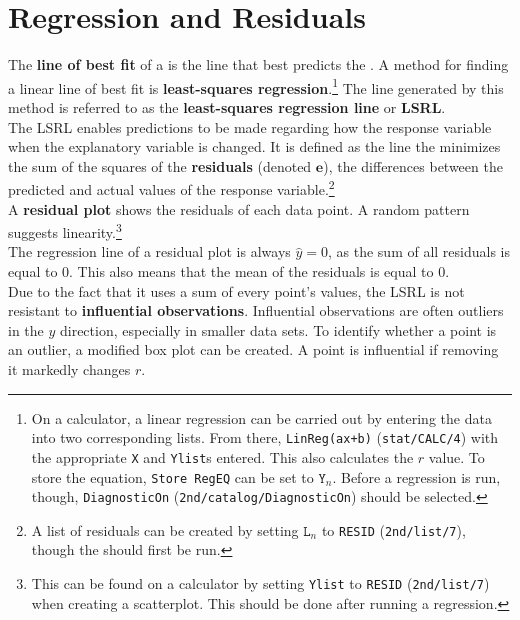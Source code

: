 \documentclass[../AP_Statistics.tex]{subfiles}
\begin{document}
		\section{Regression and Residuals}
			The \textbf{line of best fit} of a  is the line that best predicts the . A method for finding a linear line of best fit is \textbf{least-squares regression}.\footnote{On a calculator, a linear regression can be carried out by entering the data into two corresponding lists. From there, \texttt{LinReg(ax+b)} (\texttt{stat/CALC/4}) with the appropriate \texttt{X} and \texttt{Ylist}s entered. This also calculates the $r$ value. To store the equation, \texttt{Store RegEQ} can be set to $\texttt{Y}_n$. Before a regression is run, though, \texttt{DiagnosticOn} (\texttt{2nd/catalog/DiagnosticOn}) should be selected.} The line generated by this method is referred to as the \textbf{least-squares regression line} or \textbf{LSRL}. \\
			The LSRL enables predictions to be made regarding how the response variable when the explanatory variable is changed. It is defined as the line the minimizes the sum of the squares of the \textbf{residuals} (denoted $\bm{e}$), the differences between the predicted and actual values of the response variable.\footnote{A list of residuals can be created by setting $\texttt{L}_n$ to \texttt{RESID} (\texttt{2nd/list/7}), though the  should first be run.} \\
			A \textbf{residual plot} shows the residuals of each data point. A random pattern suggests linearity.\footnote{This can be found on a calculator by setting \texttt{Ylist} to \texttt{RESID} (\texttt{2nd/list/7}) when creating a scatterplot. This should be done after running a regression.} \\
			The regression line of a residual plot is always $\hat{y} = 0$, as the sum of all residuals is equal to 0. This also means that the mean of the residuals is equal to 0. \\
			Due to the fact that it uses a sum of every point's values, the LSRL is not resistant to \textbf{influential observations}. Influential observations are often outliers in the $y$ direction, especially in smaller data sets. To identify whether a point is an outlier, a modified box plot can be created. A point is influential if removing it markedly changes $r$. \\
\end{document}
